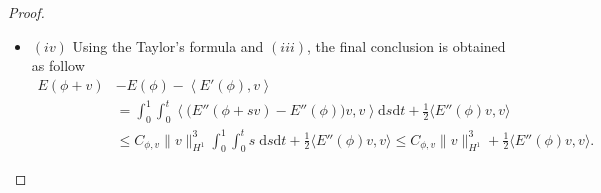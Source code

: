 \documentclass[preprint,3p]{elsarticle}
\begin{document}
\begin{proof}
\begin{itemize}[label={},left=0pt]
\begin{align}
			\nonumber&\qquad\qquad\le \left|f'(\rho_{\phi})|\phi|^2\frac{\phi^2}{|\phi|^2}-f'(\rho_{\psi})|\psi|^2\frac{\phi^2}{|\phi|^2}\right|+\left|f'(\rho_{\psi})|\psi|^2\left(\frac{\phi^2}{|\phi|^2}-\frac{\psi^2}{|\psi|^2}\right)\right|\\
			\nonumber&\qquad\qquad\le\left|f'(\rho_{\phi})|\phi|^2-f'(\rho_{\psi})|\psi|^2\right|+C|\psi|^{1+\theta}\left|\frac{\phi^2|\psi|^2-|\phi|^2\psi^2}{|\phi|^2|\psi|^2}\right|\\
			\nonumber&\qquad\qquad\le C\left(|\phi|^{\theta}+|\psi|^{\theta}\right)\left|\phi-\psi\right|+C|\psi|^{1+\theta}\left|\frac{{\phi\big(\overline{\psi}-\overline{\phi}\big)}+\overline{\phi}\left(\phi-\psi\right)}{|\phi||\psi|}\right|\\
			&\qquad\qquad\le C\left(|\phi|^{\theta}+|\psi|^{\theta}\right)\left|\phi-\psi\right|.
		\end{align}
		Using the above results, the H\"older inequality, and $H_0^1(\mathcal{D})\subset L^{p_0}(\mathcal{D})$ ($p_0=6/(4-\theta)\in\left[\frac{3}{2},6\right)$), our conclusion is as follows
		\begin{align}\label{E''-continu}
			\nonumber&\left|\left\langle \big(E''(\phi)-E''(\psi)\big)u,v\right\rangle\right|\\
		\nonumber&=\left|\left\langle\big(f(\rho_{\phi})-f(\rho_{\psi})+f'(\rho_{\phi})\big(|\phi|^2+(\phi)^2\overline{\cdot}\big)-f'(\rho_{\psi})\big(|\psi|^2+(\psi)^2\overline{\cdot}\big)\big)u,v\right\rangle\right|\\
			\nonumber&\le C\left\langle\big(|\phi|^{\theta}+|\psi|^{\theta}\big)\left|\phi-\psi\right||u|,|v|\right\rangle\\
			\nonumber&\le C\left(\|\phi\|^{\theta}_{L^6}+\|\psi\|^{\theta}_{L^6}\right)\|u\|_{L^6}\|v\|_{L^6}\|\phi-\psi\|_{L^{p_0}}\\
			&\le C_{\phi,\psi}\|u\|_{H^1}\|v\|_{H^1}\|\phi-\psi\|_{L^{p_0}}.
		\end{align}
		\item $(iv)$ Using the Taylor's formula and $(iii)$, the final conclusion is obtained as follow
		{\rm\begin{align}
				\nonumber E(\phi+v)&-E(\phi)-\left\langle E'(\phi),v\right\rangle\\
				\nonumber&=\int_0^1\int_0^t\left\langle \big(E''(\phi+sv)-E''(\phi)\big)v,v\right\rangle\text{d}s\text{d}t+\frac{1}{2}\big\langle E''(\phi)v,v\big\rangle\\
				&\le C_{\phi,v}\|v\|^3_{H^1}\int_0^1\int_0^ts\;\text{d}s\text{d}t+\frac{1}{2}\big\langle E''(\phi)v,v\big\rangle\le C_{\phi,v}\|v\|^3_{H^1}+\frac{1}{2}\big\langle E''(\phi)v,v\big\rangle.\label{Order3}
		\end{align}}
	\end{itemize}
\end{proof}
\end{document}
